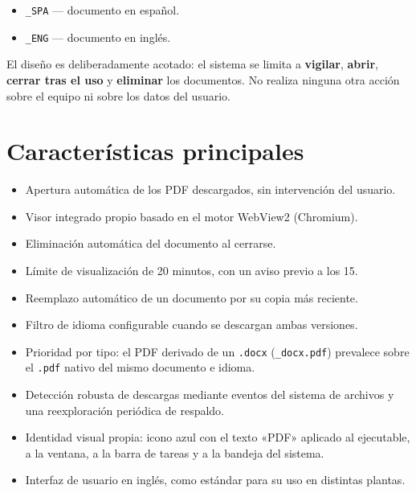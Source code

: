 \documentclass[11pt,a4paper]{article}
\begin{document}
\begin{itemize}[leftmargin=1.4em,itemsep=2pt]
  \item \texttt{\_SPA} --- documento en español.
  \item \texttt{\_ENG} --- documento en inglés.
\end{itemize}

El diseño es deliberadamente acotado: el sistema se limita a \textbf{vigilar},
\textbf{abrir}, \textbf{cerrar tras el uso} y \textbf{eliminar} los documentos.
No realiza ninguna otra acción sobre el equipo ni sobre los datos del usuario.

\section{Características principales}
\begin{itemize}[leftmargin=1.4em,itemsep=3pt]
  \item Apertura automática de los PDF descargados, sin intervención del usuario.
  \item Visor integrado propio basado en el motor WebView2 (Chromium).
  \item Eliminación automática del documento al cerrarse.
  \item Límite de visualización de 20 minutos, con un aviso previo a los 15.
  \item Reemplazo automático de un documento por su copia más reciente.
  \item Filtro de idioma configurable cuando se descargan ambas versiones.
  \item Prioridad por tipo: el PDF derivado de un \texttt{.docx}
        (\texttt{\_docx.pdf}) prevalece sobre el \texttt{.pdf} nativo del mismo
        documento e idioma.
  \item Detección robusta de descargas mediante eventos del sistema de archivos
        y una reexploración periódica de respaldo.
  \item Identidad visual propia: icono azul con el texto «PDF» aplicado al
        ejecutable, a la ventana, a la barra de tareas y a la bandeja del sistema.
  \item Interfaz de usuario en inglés, como estándar para su uso en distintas
        plantas.
\end{itemize}

\end{document}
